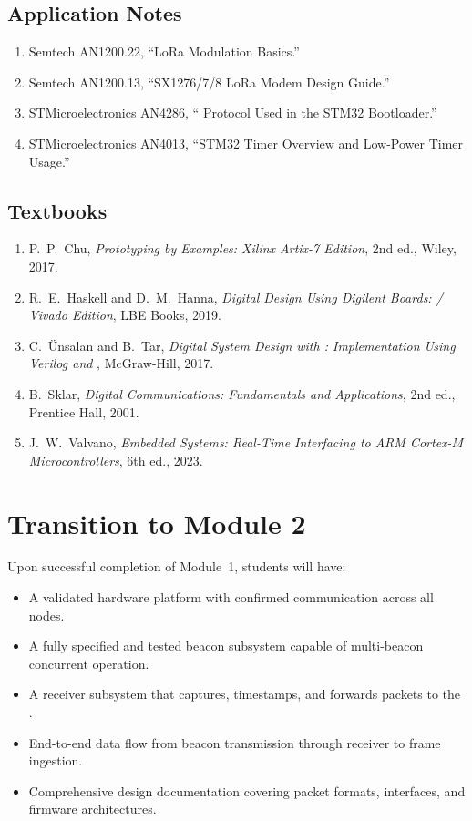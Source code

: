 \documentclass[11pt,letterpaper]{article}
\begin{document}
	\subsection{Application Notes}
	
	\begin{enumerate}[leftmargin=2em]
		\item Semtech AN1200.22, ``LoRa Modulation Basics.''
		\item Semtech AN1200.13, ``SX1276/7/8 LoRa Modem Design Guide.''
		\item STMicroelectronics AN4286, ``\SPI{} Protocol Used in the STM32 Bootloader.''
		\item STMicroelectronics AN4013, ``STM32 Timer Overview and Low-Power Timer Usage.''
	\end{enumerate}
	
	\subsection{Textbooks}
	
	\begin{enumerate}[leftmargin=2em]
		\item P.\ P.\ Chu, \textit{\FPGA{} Prototyping by \VHDL{} Examples: Xilinx Artix-7 Edition}, 2nd ed., Wiley, 2017.
		\item R.\ E.\ Haskell and D.\ M.\ Hanna, \textit{Digital Design Using Digilent \FPGA{} Boards: \VHDL{} / Vivado Edition}, LBE Books, 2019.
		\item C.\ \"Unsalan and B.\ Tar, \textit{Digital System Design with \FPGA{}: Implementation Using Verilog and \VHDL{}}, McGraw-Hill, 2017.
		\item B.\ Sklar, \textit{Digital Communications: Fundamentals and Applications}, 2nd ed., Prentice Hall, 2001.
		\item J.\ W.\ Valvano, \textit{Embedded Systems: Real-Time Interfacing to ARM Cortex-M Microcontrollers}, 6th ed., 2023.
	\end{enumerate}
	
	\newpage
	\section{Transition to Module 2}
	
	Upon successful completion of Module~1, students will have:
	\begin{itemize}[leftmargin=2em]
		\item A validated hardware platform with confirmed \SPI{} communication across all nodes.
		\item A fully specified and tested beacon subsystem capable of multi-beacon concurrent operation.
		\item A receiver subsystem that captures, timestamps, and forwards packets to the \FPGA{}.
		\item End-to-end data flow from beacon transmission through receiver to \FPGA{} frame ingestion.
		\item Comprehensive design documentation covering packet formats, interfaces, and firmware architectures.
	\end{itemize}
	
\end{document}
